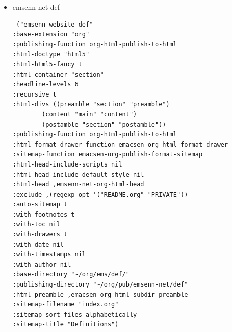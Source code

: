 \documentclass[11pt]{article}
\begin{document}
\begin{itemize}
\begin{itemize}
\begin{itemize}
\begin{itemize}
\begin{verbatim}
:publishing-function org-html-publish-to-html
:html-format-drawer-function emacsen-org-html-format-drawer
:sitemap-function emacsen-org-publish-format-sitemap
:html-head-include-scripts nil
:html-head-include-default-style nil
:html-head ,emsenn-net-org-html-head
:exclude ,(regexp-opt '("README.org" "PRIVATE"))
:auto-sitemap t
:with-footnotes t
:with-toc nil
:with-drawers t
:with-date nil
:with-timestamps nil
:with-author nil
:base-directory "~/org/ems/com/"
:publishing-directory "~/org/pub/emsenn-net/com"
:html-preamble ,emacsen-org-html-subdir-preamble
:sitemap-filename "index.org"
:sitemap-sort-files chronologically
:sitemap-title "Communications")

\end{verbatim}
\item emsenn-net-def
\label{sec:orga186cad}
\begin{verbatim}
 ("emsenn-website-def"
:base-extension "org"
:publishing-function org-html-publish-to-html
:html-doctype "html5"
:html-html5-fancy t
:html-container "section"
:headline-levels 6
:recursive t
:html-divs ((preamble "section" "preamble")
	    (content "main" "content")
	    (postamble "section" "postamble"))
:publishing-function org-html-publish-to-html
:html-format-drawer-function emacsen-org-html-format-drawer
:sitemap-function emacsen-org-publish-format-sitemap
:html-head-include-scripts nil
:html-head-include-default-style nil
:html-head ,emsenn-net-org-html-head
:exclude ,(regexp-opt '("README.org" "PRIVATE"))
:auto-sitemap t
:with-footnotes t
:with-toc nil
:with-drawers t
:with-date nil
:with-timestamps nil
:with-author nil
:base-directory "~/org/ems/def/"
:publishing-directory "~/org/pub/emsenn-net/def"
:html-preamble ,emacsen-org-html-subdir-preamble
:sitemap-filename "index.org"
:sitemap-sort-files alphabetically
:sitemap-title "Definitions")


\end{verbatim}
\end{itemize}
\end{itemize}
\end{itemize}
\end{itemize}
\end{document}
